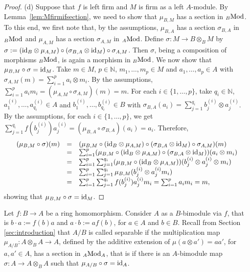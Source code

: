 \documentclass[12pt]{amsart}
\theoremstyle{definition}
\newcommand{\N}{\mathbb{N}}
\newcommand{\Mod}{{\rm Mod}}
\newcommand{\id}{{\rm id}}
\begin{document}
\begin{proof}
(d) Suppose that  $f$ is left firm and
$M$ is firm as a left $A$-module.
By Lemma~\ref{lem:Mfirmifsection}, 
we need to show that $\mu_{B,M}$
has a section in 
${}_B \Mod$. To this end, we first 
note that, by the 
assumptions, $\mu_{B,A}$ has a section
$\sigma_{B,A}$ in ${}_B \Mod$ and 
$\mu_{A,M}$ has a section $\sigma_{A,M}$
in ${}_A \Mod$. Define 
$\sigma : M \to B \otimes_B M$ by
$\sigma := (\id_B \otimes \mu_{A,M})
\circ
(\sigma_{B,A} \otimes \id_M) 
\circ 
\sigma_{A,M}$.
Then $\sigma$, being a composition
of morphisms ${}_B \Mod$, is again a
morphism in ${}_B \Mod$.
We now show that 
$\mu_{B,M} \circ \sigma = \id_M$.
Take $m \in M$,
$p \in \N$, $m_1,\ldots,m_p \in M$
and $a_1,\ldots,a_p \in A$ with 
$\sigma_{A,M}(m) = 
\sum_{i=1}^p a_i \otimes m_i$.
By the assumptions, 
$\sum_{i=1}^p a_i m_i = 
(\mu_{A,M} \circ \sigma_{A,M})(m) = m$.
For each $i \in \{ 1,\ldots,p \}$,
take $q_i \in \N$, 
$a_1^{(i)},\ldots,a_{q_i}^{(i)} \in A$ and
$b_1^{(i)},\ldots,b_{q_i}^{(i)} \in B$ with
$\sigma_{B,A}(a_i) = 
\sum_{j=1}^{q_i} b_j^{(i)}\otimes a_j^{(i)}$.
By the assumptions, for each 
$i \in \{ 1,\ldots,p \}$, we get
$\sum_{j=1}^{q_i} f(b_j^{(i)}) a_j^{(i)} = 
(\mu_{B,A} \circ \sigma_{B,A})(a_i) = a_i$.
Therefore,
\[
\begin{array}{rcl}
 (\mu_{B,M} \circ \sigma)(m) 
&=& 
(\mu_{B,M} \circ (\id_B \otimes \mu_{A,M})
\circ
(\sigma_{B,A} \otimes \id_M) 
\circ 
\sigma_{A,M}) (m) \\
&=&
\sum_{i=1}^p (\mu_{B,M} \circ 
(\id_B \otimes \mu_{A,M}) \circ
(\sigma_{B,A} \otimes \id_M))
(a_i \otimes m_i) \\
&=&
\sum_{i=1}^p \sum_{j=1}^{q_i}
(\mu_{B,M} \circ 
(\id_B \otimes \mu_{A,M}))
(b_j^{(i)}\otimes a_j^{(i)} \otimes m_i) \\
&=& 
\sum_{i=1}^p \sum_{j=1}^{q_i}
\mu_{B,M}( b_j^{(i)} \otimes a_j^{(i)} m_i) \\
&=&
\sum_{i=1}^p \sum_{j=1}^{q_i} 
f(b_j^{(i)})  a_j^{(i)} m_i = 
\sum_{i=1}^p a_i m_i = m,
\end{array}
\]
showing that 
$\mu_{B,M} \circ \sigma = \id_M$.
\end{proof}

Let $f : B \to A$ be a ring homomorphism.
Consider $A$ as a $B$-bimodule via 
$f$, that is 
$b \cdot a := f(b)a$ and 
$a \cdot b := a f(b)$, 
for $a \in A$ and $b \in B$.
Recall from Section \ref{sec:introduction}
that $A/B$ is called
separable 
if the multiplication map 
$\mu_{A/B} : A \otimes_B A \to A$,
defined by
the additive extension of
$\mu(a \otimes a') = aa'$, for $a,a' \in A$,
has a section in ${}_A \Mod_A$,
that is if
there is an $A$-bimodule map
$\sigma : A \to A \otimes_B A$ such that
$\mu_{A/B} \circ \sigma = \id_A$. 
\end{document}
